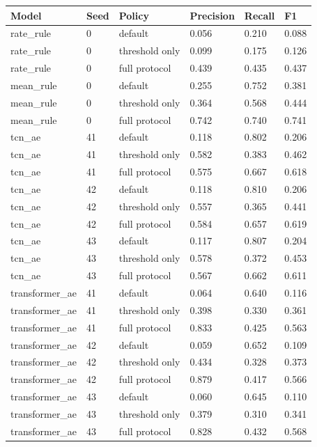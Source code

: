 \documentclass[a4paper,11pt]{article}
\newcounter{none}
\begin{document}
{\def\LTcaptype{none} %
\begin{longtable}[]{@{}llllll@{}}
\toprule\noalign{}
Model & Seed & Policy & Precision & Recall & F1 \\
\midrule\noalign{}
\endhead
\bottomrule\noalign{}
\endlastfoot
rate\_rule & 0 & default & 0.056 & 0.210 & 0.088 \\
rate\_rule & 0 & threshold only & 0.099 & 0.175 & 0.126 \\
rate\_rule & 0 & full protocol & 0.439 & 0.435 & 0.437 \\
mean\_rule & 0 & default & 0.255 & 0.752 & 0.381 \\
mean\_rule & 0 & threshold only & 0.364 & 0.568 & 0.444 \\
mean\_rule & 0 & full protocol & 0.742 & 0.740 & 0.741 \\
tcn\_ae & 41 & default & 0.118 & 0.802 & 0.206 \\
tcn\_ae & 41 & threshold only & 0.582 & 0.383 & 0.462 \\
tcn\_ae & 41 & full protocol & 0.575 & 0.667 & 0.618 \\
tcn\_ae & 42 & default & 0.118 & 0.810 & 0.206 \\
tcn\_ae & 42 & threshold only & 0.557 & 0.365 & 0.441 \\
tcn\_ae & 42 & full protocol & 0.584 & 0.657 & 0.619 \\
tcn\_ae & 43 & default & 0.117 & 0.807 & 0.204 \\
tcn\_ae & 43 & threshold only & 0.578 & 0.372 & 0.453 \\
tcn\_ae & 43 & full protocol & 0.567 & 0.662 & 0.611 \\
transformer\_ae & 41 & default & 0.064 & 0.640 & 0.116 \\
transformer\_ae & 41 & threshold only & 0.398 & 0.330 & 0.361 \\
transformer\_ae & 41 & full protocol & 0.833 & 0.425 & 0.563 \\
transformer\_ae & 42 & default & 0.059 & 0.652 & 0.109 \\
transformer\_ae & 42 & threshold only & 0.434 & 0.328 & 0.373 \\
transformer\_ae & 42 & full protocol & 0.879 & 0.417 & 0.566 \\
transformer\_ae & 43 & default & 0.060 & 0.645 & 0.110 \\
transformer\_ae & 43 & threshold only & 0.379 & 0.310 & 0.341 \\
transformer\_ae & 43 & full protocol & 0.828 & 0.432 & 0.568 \\

\end{longtable}}
\end{document}
